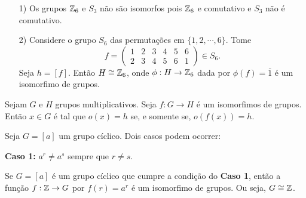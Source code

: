 \documentclass{beamer}
\begin{document}
    \begin{frame}
        \begin{exemplos}
            \vspace{.3cm}
            \begin{enumerate}
                \item[1)] Os grupos $\mathbb{Z}_6$ e $S_3$ não são isomorfos pois $\mathbb{Z}_6$ e comutativo e $S_3$ não é comutativo.

                \vspace{.3cm}

                \item[2)] Considere o grupo $S_6$ das permutações em $\{1, 2, \cdots, 6\}$. Tome
                \[
                    f = \begin{pmatrix}
                        1 & 2 & 3 & 4 & 5 & 6\\
                        2 & 3 & 4 & 5 & 6 & 1
                    \end{pmatrix} \in S_6.
                \]
                Seja $h = [f]$. Então $H \cong \mathbb{Z}_6$, onde $\phi : H \to \mathbb{Z}_6$ dada por $\phi(f) = \overline{1}$ é um isomorfimo de grupos.
                
                \vspace{.3cm}

            \end{enumerate}
        \end{exemplos}
    \end{frame}

    \begin{frame}
        \begin{proposicao}
            Sejam $G$ e $H$ grupos multiplicativos. Seja $f : G \to H$ é um isomorfimos de grupos. Então $x \in G$ é tal que $o(x) = h$ se, e somente se, $o(f(x)) = h$.
        \end{proposicao}
    \end{frame}

    \begin{frame}
        Seja $G = [a]$ um grupo cíclico. Dois casos podem ocorrer:

        \textbf{Caso 1:} $a^r \ne a^s$ sempre que $r \ne s$.
    \end{frame}

    \begin{frame}
        \begin{proposicao}
            Se $G = [a]$ é um grupo cíclico que cumpre a condição do \textbf{Caso 1}, então a função $f : \mathbb{Z} \to G$ por $f(r) = a^r$ é um isomorfimo de grupos. Ou seja, $G \cong \mathbb{Z}$.
        \end{proposicao}
    \end{frame}
\end{document}

